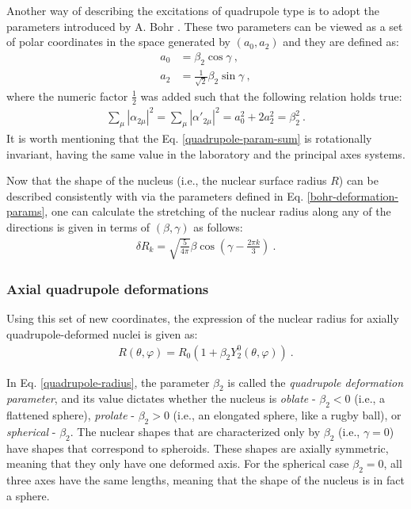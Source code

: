 Another way of describing the excitations of quadrupole type is to adopt the parameters introduced by A. Bohr \cite{bohr1954rotational}. These two parameters can be viewed as a set of polar coordinates in the space generated by $(a_0,a_2)$ and they are defined as:
\begin{align}
    a_0&=\beta_2\cos\gamma\ , \nonumber \\
    a_2&=\frac{1}{\sqrt{2}}\beta_2\sin\gamma\ , \label{bohr-deformation-params}
\end{align}
where the numeric factor $\frac{1}{2}$ was added such that the following relation holds true:
\begin{align}
    \sum_\mu\left|\alpha_{2\mu}\right|^2=\sum_\mu\left|\alpha'_{2\mu}\right|^2=a_0^2+2a_2^2=\beta_2^2\ .
    \label{quadrupole-param-sum}
\end{align}
It is worth mentioning that the Eq. \ref{quadrupole-param-sum} is rotationally invariant, having the same value in the laboratory and the principal axes systems.

Now that the shape of the nucleus (i.e., the nuclear surface radius $R$) can be described consistently with via the parameters defined in Eq. \ref{bohr-deformation-params}, one can calculate the stretching of the nuclear radius along any of the directions is given in terms of $(\beta,\gamma)$ as follows:
\begin{align}
    \delta R_k=\sqrt{\frac{5}{4\pi}}\beta\cos(\gamma-\frac{2\pi k}{3})\ .
\end{align}

\subsubsection{Axial quadrupole deformations}

Using this set of new coordinates, the expression of the nuclear radius for axially quadrupole-deformed nuclei is given as:
\begin{align}
    R(\theta,\varphi)=R_0\left(1+\beta_2 Y_2^0(\theta,\varphi)\right)\ . \label{quadrupole-radius}
\end{align}

In Eq. \ref{quadrupole-radius}, the parameter $\beta_2$ is called the \emph{quadrupole deformation parameter}, and its value dictates whether the nucleus is \emph{oblate} - $\beta_2<0$ (i.e., a flattened sphere), \emph{prolate} - $\beta_2>0$ (i.e., an elongated sphere, like a rugby ball), or \emph{spherical} - $\beta_2$.  The nuclear shapes that are characterized only by $\beta_2$ (i.e., $\gamma=0$) have shapes that correspond to spheroids. These shapes are axially symmetric, meaning that they only have one deformed axis. For the spherical case $\beta_2=0$, all three axes have the same lengths, meaning that the shape of the nucleus is in fact a sphere.

